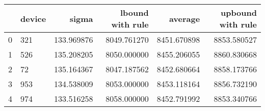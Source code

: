 \begin{tabular}{llrrrr}
\toprule
{} & device &       sigma &  lbound with rule &      average &  upbound with rule \\
\midrule
0 &    321 &  133.969876 &       8049.761270 &  8451.670898 &        8853.580527 \\
1 &    526 &  135.208205 &       8050.000000 &  8455.206055 &        8860.830668 \\
2 &     72 &  135.164367 &       8047.187562 &  8452.680664 &        8858.173766 \\
3 &    953 &  134.538009 &       8053.000000 &  8453.118164 &        8856.732190 \\
4 &    974 &  133.516258 &       8058.000000 &  8452.791992 &        8853.340766 \\
\bottomrule
\end{tabular}

